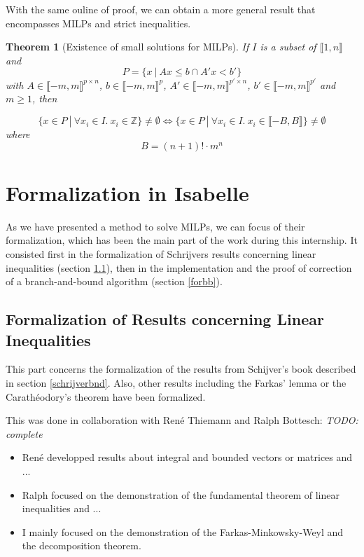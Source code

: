 \documentclass{article}
\newcommand{\ints}{\mathbb{Z}}
\newtheorem{theorem}{Theorem}
\begin{document}
With the same ouline of proof, we can obtain a more general result that
encompasses MILPs and strict inequalities. 

\begin{theorem}[Existence of small solutions for MILPs]
  \label{small-milp}
  If $I$ is a subset of $\llbracket 1, n \rrbracket$ and
  $$P = \{x~|~Ax \leqslant b \cap A'x < b'\}$$ with
  $A \in \llbracket -m, m \rrbracket^{p \times n}$,
  $b \in \llbracket -m, m \rrbracket^p$,
  $A' \in \llbracket -m, m \rrbracket^{p' \times n}$,
  $b' \in \llbracket -m, m \rrbracket^{p'}$ and $m \geqslant 1$, then

  $$\{x \in P~|~\forall x_i \in I.~x_i \in \ints\} \neq \emptyset
      \Longleftrightarrow
    \{x \in P~|~\forall x_i \in I.~x_i \in \llbracket -B, B \rrbracket\}
      \neq \emptyset$$
  where
  $$B = (n + 1)! \cdot m^n$$
\end{theorem}

\section{Formalization in Isabelle}
As we have presented a method to solve MILPs, we can focus of their
formalization, which has been the main part of the work during this internship.
It consisted first in the formalization of Schrijvers results concerning linear
inequalities (section \ref{forlineq}), then in the implementation and the proof
of correction of a branch-and-bound algorithm (section \ref{forbb}).

\subsection{Formalization of Results concerning Linear Inequalities}
\label{forlineq}
This part concerns the formalization of the results from Schijver's book
described in section \ref{schrijverbnd}.
Also, other results including the Farkas' lemma or the Carathéodory's theorem
have been formalized.

This was done in collaboration with René Thiemann and Ralph Bottesch:
\textit{TODO: complete}
\begin{itemize}
  \item René developped results about integral and bounded vectors or matrices
    and ...
  \item Ralph focused on the demonstration of the fundamental theorem of linear
    inequalities and ...
  \item I mainly focused on the demonstration of the Farkas-Minkowsky-Weyl and
    the decomposition theorem.
\end{itemize}
\end{document}
